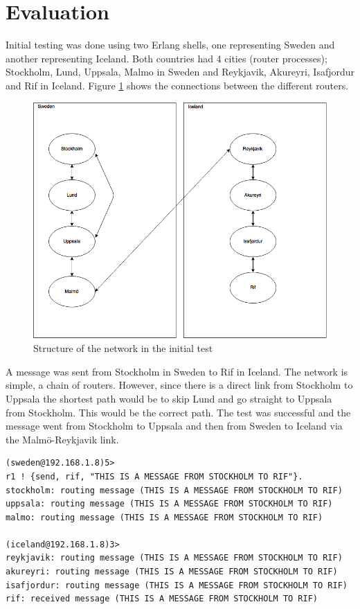 \documentclass[a4paper, 11pt]{article}
\begin{document}
\section{Evaluation}

Initial testing was done using two Erlang shells, one representing Sweden and another representing Iceland. Both countries had 4 cities (router processes); Stockholm, Lund, Uppsala, Malmo in Sweden and Reykjavik, Akureyri, Isafjordur and Rif in Iceland. Figure \ref{fig:dsbc_a2_routy_sweden_iceland} shows the connections between the different routers.

\begin{figure}[h]
  \begin{center}
    \includegraphics[width=\linewidth]{dsbc_a2_routy_sweden_iceland.png}
    \caption{Structure of the network in the initial test}
    \label{fig:dsbc_a2_routy_sweden_iceland}
  \end{center}
\end{figure}

A message was sent from Stockholm in Sweden to Rif in Iceland. The network is simple, a chain of routers. However, since there is a direct link from Stockholm to Uppsala the shortest path would be to skip Lund and go straight to Uppsala from Stockholm. This would be the correct path. The test was successful and the message went from Stockholm to Uppsala and then from Sweden to Iceland via the Malmö-Reykjavik link.

\begin{verbatim}
(sweden@192.168.1.8)5> 
r1 ! {send, rif, "THIS IS A MESSAGE FROM STOCKHOLM TO RIF"}.
stockholm: routing message (THIS IS A MESSAGE FROM STOCKHOLM TO RIF)
uppsala: routing message (THIS IS A MESSAGE FROM STOCKHOLM TO RIF)
malmo: routing message (THIS IS A MESSAGE FROM STOCKHOLM TO RIF)

(iceland@192.168.1.8)3>
reykjavik: routing message (THIS IS A MESSAGE FROM STOCKHOLM TO RIF)
akureyri: routing message (THIS IS A MESSAGE FROM STOCKHOLM TO RIF)
isafjordur: routing message (THIS IS A MESSAGE FROM STOCKHOLM TO RIF)
rif: received message (THIS IS A MESSAGE FROM STOCKHOLM TO RIF) 
\end{verbatim}
\end{document}
